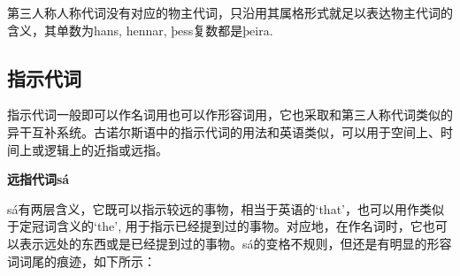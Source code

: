 第三人称人称代词没有对应的物主代词，只沿用其属格形式就足以表达物主代词的含义，其单数为hans,
hennar, þess复数都是þeira.

\subsection{指示代词}\label{ux6307ux793aux4ee3ux8bcd}

指示代词一般即可以作名词用也可以作形容词用，它也采取和第三人称代词类似的异干互补系统。古诺尔斯语中的指示代词的用法和英语类似，可以用于空间上、时间上或逻辑上的近指或远指。

\textbf{远指代词sá}

sá有两层含义，它既可以指示较远的事物，相当于英语的`that‌'，也可以用作类似于定冠词含义的`the‌',
用于指示已经提到过的事物。对应地，在作名词时，它也可以表示远处的东西或是已经提到过的事物。sá的变格不规则，但还是有明显的形容词词尾的痕迹，如下所示：

